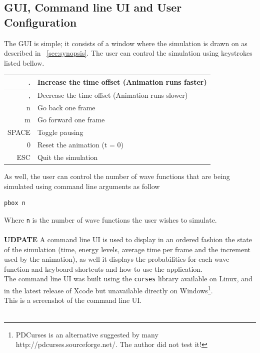 \documentclass[a4paper, 10pt]{article}
\begin{document}
    \subsection{GUI, Command line UI and User Configuration}
    The GUI is simple; it consists of a window where the simulation is drawn on
    as described in ~\ref{sec:synopsis}. The user can control the simulation using keystrokes listed bellow.
    \begin{center}
        \begin{tabular}{|r|l|}
        \hline
            . & Increase the time offset (Animation runs faster) \\ \hline
            , & Decrease the time offset (Animation runs slower) \\ \hline
            n & Go back one frame \\ \hline
            m & Go forward one frame\\ \hline
            SPACE & Toggle pausing \\ \hline
            0 & Reset the animation (t = 0) \\ \hline
            ESC & Quit the simulation \\ \hline
        \end{tabular}
    \end{center}
    As well, the user can control the number of wave functions that are being simulated using
    command line arguments as follow
    \begin{verbatim}pbox n\end{verbatim}
    Where \verb|n| is the number of wave functions the user wishes to simulate.\\\\
    {\bf UDPATE} A command line UI is used to display in an ordered fashion the state of the simulation
    (time, energy levels, average time per frame and the increment used by the animation), as well it
    displays the probabilities for each wave function and keyboard shortcuts and how to use the application.\\
    The command line UI was built using the \verb|curses| library available on Linux, and in the latest
    release of Xcode but unavailable directly on Windows\footnote{PDCurses is an alternative suggested
    by many http://pdcurses.sourceforge.net/. The author did not test it!}.\\
    This is a screenshot of the command line UI.\\\\
\end{document}
